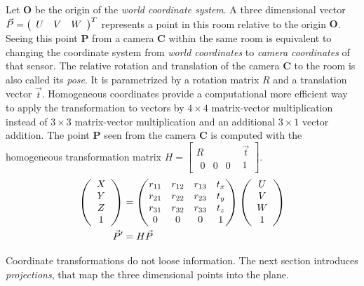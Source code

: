 Let $\mathbf{O}$ be the origin of the \emph{world coordinate system}.
A three dimensional vector $\vec{P} = \left(\begin{array}{ccc} U & V & W \end{array}\right)^T$ represents a point in this room relative to the origin $\mathbf{O}$.
Seeing this point $\mathbf{P}$ from a camera $\mathbf{C}$ within the same room is equivalent to changing the coordinate system from \emph{world coordinates} to \emph{camera coordinates} of that sensor.
The relative rotation and translation of the camera $\mathbf{C}$ to the room is also called its \emph{pose}.
It is parametrized by a rotation matrix $R$ and a translation vector $\vec{t}$.
Homogeneous coordinates provide a computational more efficient way to apply the transformation to vectors by $4 \times 4$ matrix-vector multiplication instead of $3 \times 3$ matrix-vector multiplication and an additional $3 \times 1$ vector addition.
The point $\mathbf{P}$ seen from the camera $\mathbf{C}$ is computed with the homogeneous transformation matrix $H = \begin{bmatrix} R & \vec{t} \\ 
    \begin{matrix}0 & 0 & 0\end{matrix} & 1 \end{bmatrix}$.
\begin{equation}
\begin{aligned}
    \left(\begin{array}{c} X \\ Y \\ Z \\ 1\end{array}\right)&= \begin{pmatrix}
        r_{11} & r_{12} & r_{13} & t_x \\
        r_{21} & r_{22} & r_{23} & t_y \\
        r_{31} & r_{32} & r_{33} & t_z \\
        0      & 0      & 0      & 1 \\
    \end{pmatrix} \left(\begin{array}{c} U \\ V \\ W \\ 1\end{array}\right) \\
    \vec{P}' &= H \vec{P}
\end{aligned}
\end{equation}

Coordinate transformations do not loose information.
The next section introduces \emph{projections}, that map the three dimensional points into the plane.
